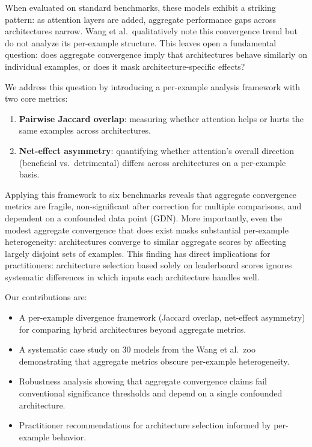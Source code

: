 \documentclass[11pt,a4paper]{article}
\begin{document}
When evaluated on standard benchmarks, these models exhibit a striking pattern: as attention layers are added, aggregate performance gaps across architectures narrow.
Wang et al.\ qualitatively note this convergence trend but do not analyze its per-example structure.
This leaves open a fundamental question: does aggregate convergence imply that architectures behave similarly on individual examples, or does it mask architecture-specific effects?

We address this question by introducing a per-example analysis framework with two core metrics:
\begin{enumerate}
    \item \textbf{Pairwise Jaccard overlap}: measuring whether attention helps or hurts the same examples across architectures.
    \item \textbf{Net-effect asymmetry}: quantifying whether attention's overall direction (beneficial vs.\ detrimental) differs across architectures on a per-example basis.
\end{enumerate}

Applying this framework to six benchmarks reveals that aggregate convergence metrics are fragile, non-significant after correction for multiple comparisons, and dependent on a confounded data point (GDN).
More importantly, even the modest aggregate convergence that does exist masks substantial per-example heterogeneity: architectures converge to similar aggregate scores by affecting largely disjoint sets of examples.
This finding has direct implications for practitioners: architecture selection based solely on leaderboard scores ignores systematic differences in which inputs each architecture handles well.

Our contributions are:
\begin{itemize}
    \item A per-example divergence framework (Jaccard overlap, net-effect asymmetry) for comparing hybrid architectures beyond aggregate metrics.
    \item A systematic case study on 30 models from the Wang et al.\ zoo demonstrating that aggregate metrics obscure per-example heterogeneity.
    \item Robustness analysis showing that aggregate convergence claims fail conventional significance thresholds and depend on a single confounded architecture.
    \item Practitioner recommendations for architecture selection informed by per-example behavior.
\end{itemize}
\end{document}
